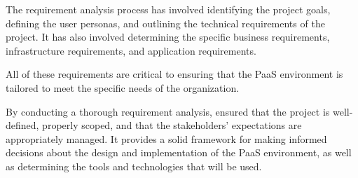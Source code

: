 The requirement analysis process has involved identifying the project goals, defining the user personas, and outlining the technical requirements of the project. It has also involved determining the specific business requirements, infrastructure requirements, and application requirements. 

All of these requirements are critical to ensuring that the PaaS environment is tailored to meet the specific needs of the organization. 

By conducting a thorough requirement analysis, ensured that the project is well-defined, properly scoped, and that the stakeholders' expectations are appropriately managed. It provides a solid framework for making informed decisions about the design and implementation of the PaaS environment, as well as determining the tools and technologies that will be used.